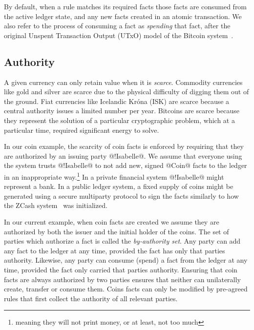 By default, when a rule matches its required facts those facts are consumed from the active ledger state, and any new facts created in an atomic transaction. We also refer to the process of consuming a fact as \emph{spending} that fact, after the original Unspent Transaction Output (UTxO) model of the Bitcoin system~\cite{Zahnentferner2018:UTxO}.




\subsection{Authority}
\label{s:FactAuthority}
A given currency can only retain value when it is \emph{scarce}. Commodity currencies like gold and silver are scarce due to the physical difficulty of digging them out of the ground. Fiat currencies like Icelandic Kr\'ona (ISK) are scarce because a central authority issues a limited number per year. Bitcoins are scarce because they represent the solution of a particular cryptographic problem, which at a particular time, required significant energy to solve.

In our coin example, the scarcity of coin facts is enforced by requiring that they are authorized by an issuing party @!Isabelle@. We assume that everyone using the system trusts @!Isabelle@ to not add new, signed @Coin@ facts to the ledger in an inappropriate way.\footnote{meaning they will not print money, or at least, not too much} In a private financial system @!Isabelle@ might represent a bank. In a public ledger system, a fixed supply of coins might be generated using a secure multiparty protocol to sign the facts similarly to how the ZCash system~\cite{Bowe2018:MultiParty, Hopwood2016:zcash} was initialized.

In our current example, when coin facts are created we assume they are authorized by both the issuer and the initial holder of the coins. The set of parties which authorize a fact is called the \emph{by-authority set}. Any party can add any fact to the ledger at any time, provided the fact has only that parties authority. Likewise, any party can consume (spend) a fact from the ledger at any time, provided the fact only carried that parties authority. Ensuring that coin facts are always authorized by two parties ensures that neither can unilaterally create, transfer or consume them. Coins facts can only be modified by pre-agreed rules that first collect the authority of all relevant parties.


